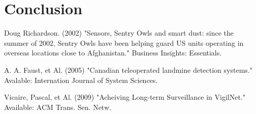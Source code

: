 \documentclass{article}
\begin{document}
    \section{Conclusion}
        

    
    \newpage
\clearpage

\appendix

\begin{thebibliography}{00}



 Doug Richardson. (2002) "Sensors, Sentry Owls and smart dust: since the summer of 2002, Sentry Owls have been helping guard US units operating in overseas locations close to Afghanistan." Business Insights: Essentials. 
\newline

 A. A. Faust, et Al. (2005) "Canadian teleoperated landmine detection systems." Avalable: Internation Journal of System Sciences.
\newline

 Vicaire, Pascal, et Al. (2009) "Acheiving Long-term Surveillance in VigilNet." Available: ACM Trans. Sen. Netw.
\newline

\newpage


\end{thebibliography}
\end{document}
